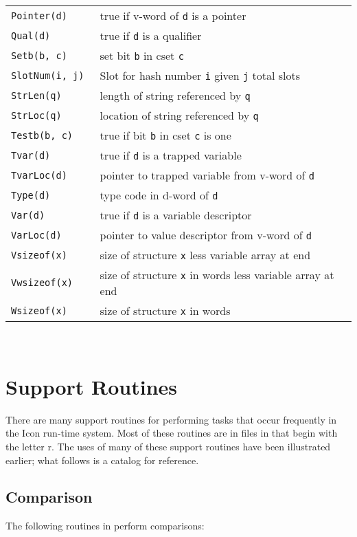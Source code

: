 {\begin{xtabular}{>{\hspace{1cm}\texttt\bgroup}l<{\egroup}@{\hspace{1cm}}p{11cm}}
Pointer(d)        & true if v-word of \texttt{d} is a pointer\\
Qual(d)           & true if \texttt{d} is a qualifier\\
Setb(b, c)        & set bit \texttt{b} in cset \texttt{c}\\
SlotNum(i, j)     & Slot for hash number \texttt{i} given \texttt{j} total slots\\
StrLen(q)         & length of string referenced by \texttt{q}\\
StrLoc(q)         & location of string referenced by \texttt{q}\\
Testb(b, c)       & true if bit \texttt{b} in cset \texttt{c} is one\\
Tvar(d)           & true if \texttt{d} is a trapped variable\\
TvarLoc(d)        & pointer to trapped variable from v-word of \texttt{d}\\
Type(d)           & type code in d-word of \texttt{d}\\
Var(d)            & true if \texttt{d} is a variable descriptor\\
VarLoc(d)         & pointer to value descriptor from v-word of \texttt{d}\\
Vsizeof(x)        & size of structure \texttt{x} less variable array at end\\
Vwsizeof(x)       & size of structure \texttt{x} in words less variable array at end\\
Wsizeof(x)        & size of structure \texttt{x} in words\\
\end{xtabular}
}\\[1ex]

\section{Support Routines}

There are many support routines for performing tasks that occur frequently in
the Icon run-time system. Most of these routines are in files in 
that begin with the letter r. The uses of many of these support routines have
been illustrated earlier; what follows is a catalog for reference.

\subsection{Comparison}

The following routines in  perform comparisons:

